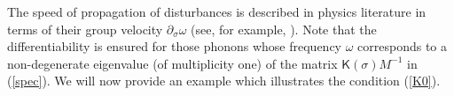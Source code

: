 \documentclass[letterpaper, 10pt, conference]{ieeeconf}  %
\def\d{\partial}
\def\mZ{\mathbb{Z}}    %
\def\mR{\mathbb{R}}    %
\def\x{\times}
\def\sK{\mathsf{K}}
\def\cI{\mathcal{I}}
\def\cA{\mathcal{A}}
\def\mZ{\mathbb{Z}}
\begin{document}
The speed of propagation of disturbances is described in physics literature  in terms of their group velocity $\d_{\sigma}\omega$ (see, for example, \cite{LL_1980}). Note that the differentiability  is ensured for those phonons whose frequency $\omega$ corresponds to a non-degenerate  eigenvalue (of multiplicity one) of the matrix $\sK(\sigma)M^{-1}$ in (\ref{spec}).
%
%
%
%
%
We will now provide an example which illustrates the condition (\ref{K0}).
\end{document}
